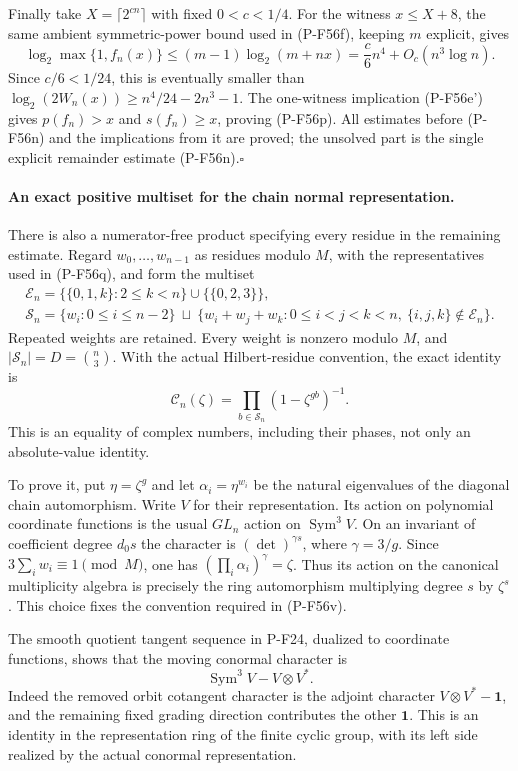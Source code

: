 \documentclass[11pt,a4paper]{article}
\begin{document}
Finally take $X=\lceil2^{cn}\rceil$ with fixed $0<c<1/4$.
For the witness $x\le X+8$, the same ambient symmetric-power
bound used in (P-F56f), keeping $m$ explicit, gives
\[
 \log_2\max\{1,f_n(x)\}
 \le (m-1)\log_2(m+nx)
 =\frac c6 n^4+O_c(n^3\log n).
 \tag{P-F56t}
\]
Since $c/6<1/24$, this is eventually smaller than
$\log_2(2W_n(x))\ge n^4/24-2n^3-1$.
The one-witness implication (P-F56e') gives
$p(f_n)>x$ and $s(f_n)\ge x$, proving (P-F56p).
All estimates before (P-F56n) and the implications from it
are proved; the unsolved part is the single explicit
remainder estimate (P-F56n).\hfill$\square$

\paragraph{An exact positive multiset for the chain normal representation.}
There is also a numerator-free product specifying every residue
in the remaining estimate. Regard
$w_0,\ldots,w_{n-1}$ as residues modulo $M$, with the
representatives used in (P-F56q), and form the multiset
\[
 \begin{gathered}
 \mathcal E_n=
 \{\{0,1,k\}:2\le k<n\}\cup\{\{0,2,3\}\},\\
 \mathcal S_n=\{w_i:0\le i\le n-2\}\ \sqcup\
 \{w_i+w_j+w_k:0\le i<j<k<n,\
       \{i,j,k\}\notin\mathcal E_n\}.
 \end{gathered}
 \tag{P-F56u}
\]
Repeated weights are retained. Every weight is nonzero modulo
$M$, and $|\mathcal S_n|=D=\binom n3$.
With the actual Hilbert-residue convention, the exact identity is
\[
 \mathcal C_n(\zeta)=
                 \prod_{b\in\mathcal S_n}(1-\zeta^{gb})^{-1}.
 \tag{P-F56v}
\]
This is an equality of complex numbers, including their phases,
not only an absolute-value identity.

To prove it, put $\eta=\zeta^g$ and let
$\alpha_i=\eta^{w_i}$ be the natural eigenvalues of the diagonal
chain automorphism. Write $V$ for their representation.
Its action on polynomial coordinate functions is the usual
$GL_n$ action on $\operatorname{Sym}^3 V$.
On an invariant of coefficient degree $d_0s$ the character is
$(\det)^{\gamma s}$, where $\gamma=3/g$.
Since $3\sum_i w_i\equiv1\pmod M$, one has
$(\prod_i\alpha_i)^\gamma=\zeta$.
Thus its action on the canonical multiplicity algebra is precisely
the ring automorphism multiplying degree $s$ by $\zeta^s$.
This choice fixes the convention required in (P-F56v).

The smooth quotient tangent sequence in P-F24, dualized to
coordinate functions, shows that the moving conormal character is
\[
 \operatorname{Sym}^3 V-V\otimes V^*.
 \tag{P-F56w}
\]
Indeed the removed orbit cotangent character is the adjoint
character $V\otimes V^*-\mathbf1$, and the remaining fixed
grading direction contributes the other $\mathbf1$.
This is an identity in the representation ring of the finite
cyclic group, with its left side realized by the actual
conormal representation.
\end{document}
